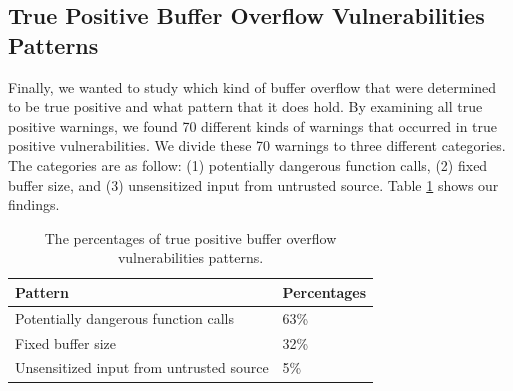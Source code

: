 \subsection{True Positive Buffer Overflow Vulnerabilities Patterns}

Finally, we wanted to study which kind of buffer overflow that were determined to be true positive and what pattern that it does hold. By examining all true positive warnings, we found 70 different kinds of warnings that occurred in true positive vulnerabilities. We divide these 70 warnings to three different  categories. The categories are as follow: (1) potentially dangerous function calls, (2) fixed buffer size, and (3) unsensitized input from untrusted source. Table \ref{patterns} shows our findings.




\begin{table}[ht]
\centering
\scriptsize
\caption{The percentages of true positive buffer overflow vulnerabilities patterns.}
\label{patterns}
\begin{tabular}{||p{5cm}|p{2cm} ||}
\hline
\textbf{Pattern} & \textbf{Percentages}  	\\
\hline\hline
Potentially dangerous function calls &  63\% \\
Fixed buffer size & 32\%  \\
Unsensitized input from untrusted source & 5\%\\
\hline
\end{tabular}
\end{table}
